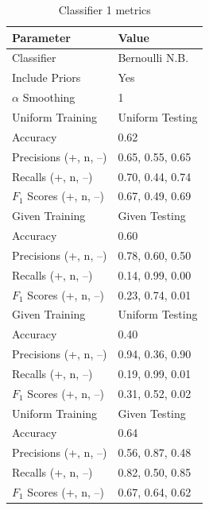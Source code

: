 \documentclass[11pt]{article}
\begin{document}
\begin{table}[H]
	\begin{center}
		\begin{tabular}{|l|l|}			
			\hline
			Parameter & Value \\
			\hline
			Classifier & Bernoulli N.B. \\
			Include Priors & Yes \\
			$\alpha$ Smoothing & 1 \\
			\hline\hline
			Uniform Training & Uniform Testing \\
			\hline
			Accuracy & 0.62 \\
			Precisions (+, n, --)	& 0.65, 0.55, 0.65 \\
			Recalls (+, n, --) 		& 0.70, 0.44, 0.74 \\
			$F_1$ Scores (+, n, --) & 0.67, 0.49, 0.69 \\
			\hline\hline
			Given Training & Given Testing \\
			\hline
			Accuracy & 0.60 \\
			Precisions (+, n, --) 	& 0.78, 0.60, 0.50 \\
			Recalls (+, n, --) 		& 0.14, 0.99, 0.00 \\
			$F_1$ Scores (+, n, --) & 0.23, 0.74, 0.01 \\
			\hline\hline
			Given Training & Uniform Testing \\
			\hline
			Accuracy & 0.40 \\
			Precisions (+, n, --) 	& 0.94, 0.36, 0.90 \\
			Recalls (+, n, --) 		& 0.19, 0.99, 0.01 \\
			$F_1$ Scores (+, n, --) & 0.31, 0.52, 0.02 \\
			\hline\hline
			Uniform Training & Given Testing \\
			\hline
			Accuracy & 0.64 \\
			Precisions (+, n, --) 	& 0.56, 0.87, 0.48 \\
			Recalls (+, n, --) 		& 0.82, 0.50, 0.85 \\
			$F_1$ Scores (+, n, --) & 0.67, 0.64, 0.62 \\
			\hline
		\end{tabular}
		\caption{Classifier 1 metrics}
		\label{tbl:metrics-1st10000}
	\end{center}
\end{table}

\end{document}
